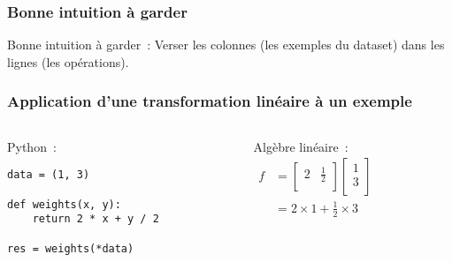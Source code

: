 \begin{frame}
  \frametitle{Bonne intuition à garder}

  Bonne intuition à garder : Verser les colonnes (les exemples du
  dataset) dans les lignes (les opérations).
\end{frame}

\begin{frame}[fragile]
  \frametitle{Application d'une transformation linéaire à un exemple}
  \begin{columns}
    \begin{column}{0.5\textwidth}
      Python :
\begin{verbatim}
data = (1, 3)

def weights(x, y):
    return 2 * x + y / 2

res = weights(*data)
\end{verbatim}
    \end{column}
    \begin{column}{0.5\textwidth}
      Algèbre linéaire : \\[.3cm]

      \(
      \begin{aligned}
        f & = \begin{bmatrix}
          2 & \frac{1}{2} \\
        \end{bmatrix}
        \begin{bmatrix}
          1 \\
          3 \\
        \end{bmatrix} \\
        & = 2 \times 1 + \frac{1}{2} \times 3
      \end{aligned}
      \)
    \end{column}
  \end{columns}
\end{frame}

